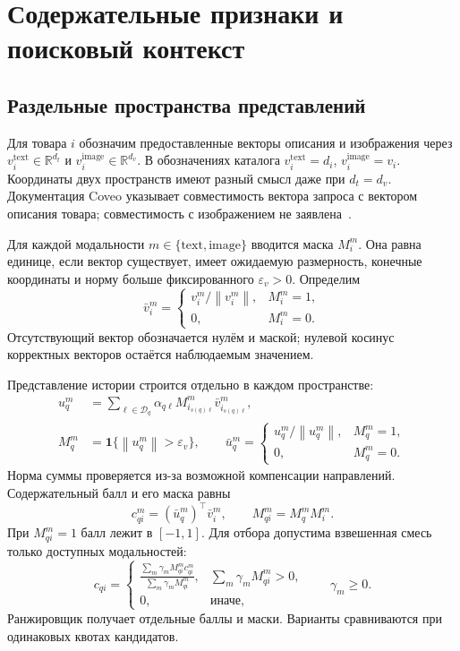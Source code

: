 \documentclass[12pt,a4paper]{article}
\newcommand{\R}{\mathbb R}
\newcommand{\ind}{\mathbf 1}
\newcommand{\eps}{\varepsilon}
\newcommand{\norm}[1]{\left\lVert#1\right\rVert}
\theoremstyle{plainru}
\begin{document}
\section{Содержательные признаки и поисковый контекст}\label{sec:model-content}

\subsection{Раздельные пространства представлений}

Для товара $i$ обозначим предоставленные векторы описания и изображения
через $v_i^{\mathrm{text}}\in\R^{d_t}$ и
$v_i^{\mathrm{image}}\in\R^{d_v}$.
В обозначениях каталога $v_i^{\mathrm{text}}=d_i$,
$v_i^{\mathrm{image}}=v_i$.
Координаты двух пространств имеют разный смысл даже при $d_t=d_v$.
Документация Coveo указывает совместимость вектора запроса
с вектором описания товара; совместимость с изображением
не заявлена~\cite{coveo-data}.

Для каждой модальности $m\in\{\mathrm{text},\mathrm{image}\}$
вводится маска $M_i^m$. Она равна единице, если вектор существует,
имеет ожидаемую размерность, конечные координаты и норму больше
фиксированного $\eps_v>0$. Определим
\begin{equation}\label{eq:model-vector-normalization}
\bar v_i^m=
\begin{cases}
v_i^m/\norm{v_i^m},&M_i^m=1,\\
0,&M_i^m=0.
\end{cases}
\end{equation}
Отсутствующий вектор обозначается нулём и маской; нулевой косинус
корректных векторов остаётся наблюдаемым значением.

Представление истории строится отдельно в каждом пространстве:
\begin{align}\label{eq:model-session-vector}
u_q^m&=\sum_{\ell\in\mathcal D_q}
\alpha_{q\ell}M^m_{i_{s(q)\ell}}\bar v^m_{i_{s(q)\ell}},\\
M_q^m&=\ind\{\norm{u_q^m}>\eps_v\},\qquad
\bar u_q^m=\begin{cases}u_q^m/\norm{u_q^m},&M_q^m=1,\\
0,&M_q^m=0.\end{cases}\nonumber
\end{align}
Норма суммы проверяется из-за возможной компенсации направлений.
Содержательный балл и его маска равны
\begin{equation}\label{eq:model-content-score}
c^m_{qi}=(\bar u_q^m)^\top\bar v_i^m,\qquad
M^m_{qi}=M_q^m M_i^m.
\end{equation}
При $M^m_{qi}=1$ балл лежит в $[-1,1]$.
Для отбора допустима взвешенная смесь только доступных модальностей:
\begin{equation}\label{eq:model-content-fusion}
c_{qi}=
\begin{cases}
\displaystyle\frac{\sum_m\gamma_m M^m_{qi}c^m_{qi}}
 {\sum_m\gamma_m M^m_{qi}},&\sum_m\gamma_m M^m_{qi}>0,\\[0.3em]
0,&\text{иначе},
\end{cases}
\qquad \gamma_m\ge0.
\end{equation}
Ранжировщик получает отдельные баллы и маски.
Варианты сравниваются при одинаковых квотах кандидатов.
\end{document}
